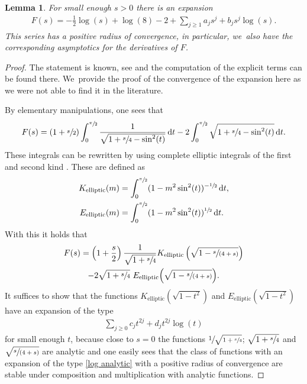 \documentclass[JEP,XML,SOM,Unicode,published]{cedram}
\newcommand{\spfrac}[2]{\sfrac{#1}{(#2)}}
\newtheorem{lemma}[theorem]{Lemma}
\theoremstyle{definition}
\newcommand\eq{=}
\newcommand\dd{\,\mathrm{d}}
\newcommand\dt{\dd t}
\begin{document}
\begin{lemma}\label{Series F}
For small enough $s>0$ there is an expansion
\begin{align}
F(s)=-\frac{1}{2}\log(s)+\log(8)-2+\sum_{j\geq 1} a_js^j+b_js^j\log(s).\label{exp F}
\end{align}
This series has a positive radius of convergence, in particular, we~also have the corresponding asymptotics for the derivatives of $F$.
\end{lemma}
\begin{proof}
The statement is known, see \eg \cite[Footnote 101]{Sverak} and the computation of the explicit terms can be found there. We~provide the proof of the convergence of the expansion here as we were not able to find it in the literature.

By elementary manipulations, one sees that
\begin{align*}
F(s)\eq(1+\sfrac{s}{2})\int_0^{\sfrac{\pi}{2}}\frac{1}{\sqrt{1+\sfrac{s}{4}-\sin^2(t)}}\dt-2\int_0^{\sfrac{\pi}{2}}\sqrt{1+\sfrac{s}{4}-\sin^2(t)}\dt.
\end{align*}
These integrals can be rewritten by using complete elliptic integrals of the first and second kind \cite{byrd2013handbook}. These are defined as
\begin{align*}
K_\mathrm{elliptic}(m)&=\int_0^{\sfrac{\pi}{2}}(1-m^2\sin^2(t))^{-\sfrac{1}{2}}\dt,\\
E_\mathrm{elliptic}(m)&=\int_0^{\sfrac{\pi}{2}}(1-m^2\sin^2(t))^{\sfrac{1}{2}}\dt.
\end{align*}
With this it holds that
\begin{multline*}
F(s)\eq\left(1+\frac{s}{2}\right)\frac{1}{\sqrt{1+\sfrac{s}{4}}}K_\mathrm{elliptic}\left(\sqrt{1-\spfrac{s}{4+s}}\right)\\
-2\sqrt{1+\sfrac{s}{4}}\,\,E_\mathrm{elliptic}\Bigl(\sqrt{1-\spfrac{s}{4+s}}\Bigr).
\end{multline*}
It suffices to show that the functions $K_\mathrm{elliptic}(\sqrt{1-t^2})$ and $E_\mathrm{elliptic}(\sqrt{1-t^2})$ have an expansion of the type
\begin{align}
\sum_{j\geq 0}c_jt^{2j}+d_jt^{2j}\log (t)\label{log analytic}
\end{align}
for small enough $t$, because close to $s=0$ the functions $\sfrac{1}{\sqrt{1+\sfrac{s}{4}}}$; $\sqrt{1+\sfrac{s}{4}}$ and $\sqrt{\spfrac{s}{4+s}}$ are analytic and one easily sees that the class of functions with an expansion of the type \eqref{log analytic} with a positive radius of convergence are stable under composition and multiplication with analytic functions.


\end{proof}
\end{document}
